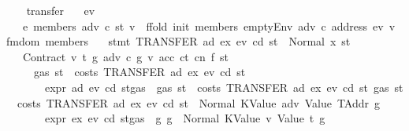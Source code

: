 \begin{isabellebody}
\ \ \isamarkupfalse%
\isanewline
{}\isamarkupfalse%
%
\endisatagproof
{\isafoldproof}%
%
\isadelimproof
\isanewline
%
\endisadelimproof
\isanewline
{}\isamarkupfalse%
\ transfer{\isacharcolon}{\kern0pt}\isanewline
\ \ \ ev\isanewline
\ \ \ {\isachardoublequoteopen}e{\isacharprime}{\kern0pt}\ members\ adv\ c\ st\ v\ {\isasymequiv}\ ffold\ {\isacharparenleft}{\kern0pt}init\ members{\isacharparenright}{\kern0pt}\ {\isacharparenleft}{\kern0pt}emptyEnv\ adv\ c\ {\isacharparenleft}{\kern0pt}address\ ev{\isacharparenright}{\kern0pt}\ v{\isacharparenright}{\kern0pt}\ {\isacharparenleft}{\kern0pt}fmdom\ members{\isacharparenright}{\kern0pt}{\isachardoublequoteclose}\isanewline
\ \ \ {\isachardoublequoteopen}stmt\ {\isacharparenleft}{\kern0pt}TRANSFER\ ad\ ex{\isacharparenright}{\kern0pt}\ ev\ cd\ st\ {\isacharequal}{\kern0pt}\ Normal\ {\isacharparenleft}{\kern0pt}x{\isacharcomma}{\kern0pt}\ st{\isacharprime}{\kern0pt}{\isacharparenright}{\kern0pt}{\isachardoublequoteclose}\isanewline
\ \ \ {\isacharparenleft}{\kern0pt}Contract{\isacharparenright}{\kern0pt}\ v\ t\ g\ adv\ c\ g{\isacharprime}{\kern0pt}\ v{\isacharprime}{\kern0pt}\ acc\ ct\ cn\ f\ st{\isacharprime}{\kern0pt}{\isacharprime}{\kern0pt}\isanewline
\ \ \ \ \ {\isachardoublequoteopen}gas\ st\ {\isachargreater}{\kern0pt}\ costs\ {\isacharparenleft}{\kern0pt}TRANSFER\ ad\ ex{\isacharparenright}{\kern0pt}\ ev\ cd\ st{\isachardoublequoteclose}\isanewline
\ \ \ \ \ \ \ {\isachardoublequoteopen}expr\ ad\ ev\ cd\ {\isacharparenleft}{\kern0pt}st{\isasymlparr}gas\ {\isacharcolon}{\kern0pt}{\isacharequal}{\kern0pt}\ gas\ st\ {\isacharminus}{\kern0pt}\ costs\ {\isacharparenleft}{\kern0pt}TRANSFER\ ad\ ex{\isacharparenright}{\kern0pt}\ ev\ cd\ st{\isasymrparr}{\isacharparenright}{\kern0pt}\ {\isacharparenleft}{\kern0pt}gas\ st\ {\isacharminus}{\kern0pt}\ costs\ {\isacharparenleft}{\kern0pt}TRANSFER\ ad\ ex{\isacharparenright}{\kern0pt}\ ev\ cd\ st{\isacharparenright}{\kern0pt}\ {\isacharequal}{\kern0pt}\ Normal\ {\isacharparenleft}{\kern0pt}{\isacharparenleft}{\kern0pt}KValue\ adv{\isacharcomma}{\kern0pt}\ Value\ TAddr{\isacharparenright}{\kern0pt}{\isacharcomma}{\kern0pt}\ g{\isacharparenright}{\kern0pt}{\isachardoublequoteclose}\isanewline
\ \ \ \ \ \ \ {\isachardoublequoteopen}expr\ ex\ ev\ cd\ {\isacharparenleft}{\kern0pt}st{\isasymlparr}gas\ {\isacharcolon}{\kern0pt}{\isacharequal}{\kern0pt}\ g{\isasymrparr}{\isacharparenright}{\kern0pt}\ g\ {\isacharequal}{\kern0pt}\ Normal\ {\isacharparenleft}{\kern0pt}{\isacharparenleft}{\kern0pt}KValue\ v{\isacharcomma}{\kern0pt}\ Value\ t{\isacharparenright}{\kern0pt}{\isacharcomma}{\kern0pt}\ g{\isacharprime}{\kern0pt}{\isacharparenright}{\kern0pt}{\isachardoublequoteclose}\isanewline

\end{isabellebody}
